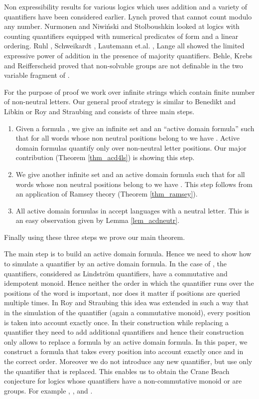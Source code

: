 \documentclass[envcountsame]{llncs}
\begin{document}
Non expressibility results for various logics which uses addition and a variety of quantifiers have been considered earlier. Lynch \cite{lynch82} proved that  cannot count modulo any number. Nurmonen \cite{nur_countQuant} and Niwi\'nski and Stolboushkin \cite{niw_yEq2x} looked at logics with counting quantifiers equipped with numerical predicates of form  and a linear ordering. Ruhl \cite{ruhl_FOUnc}, Schweikardt \cite{schwei_FOUnc},
Lautemann et.al. \cite{lautemann_logcfl}, Lange \cite{lange_majQnt} all showed the limited expressive power of addition in the presence of majority quantifiers. Behle, Krebs and Reifferscheid \cite{behle_regLangMajQnt,behle_nonSolvGrpsNotinMaj} proved that non-solvable groups are not definable in the two variable fragment of . 


For the purpose of proof we work over infinite strings which contain finite number of non-neutral letters. 
Our general proof strategy is similar to Benedikt and Libkin \cite{libkin_relIntrStruc} or Roy and Straubing \cite{roy_defGenFO} and consists of three main steps.
\begin{enumerate}
 \item Given a formula , we give an infinite set  and an ``active domain formula''  such that for all words  whose non neutral positions belong to  we have 
 .
 Active domain formulas quantify only over non-neutral letter positions. Our major contribution (Theorem \ref{thm_acd4ls}) is  showing
 this step.  
 \item We give another infinite set  and an active domain formula  such that for all words  whose non neutral positions belong to  we have 
 .
 This step follows from an application of Ramsey theory (Theorem \ref{thm_ramsey}).
 \item All active domain formulas in  accept languages with a neutral letter. This is an easy observation given by Lemma \ref{lem_acdneutr}.
\end{enumerate}
Finally using these three steps we prove our main theorem.

The main step is to build an active domain formula. Hence we need to show how to simulate a quantifier by an active domain formula.
In the case of , the quantifiers, considered as Lindstr\"om quantifiers, have a commutative and idempotent monoid. Hence
neither the order in which the quantifier runs over the positions of the word is important, nor does it matter if positions are queried
multiple times.
In Roy and Straubing this idea was extended in such a way that in the simulation of the  quantifier (again a commutative monoid),
every position is taken into account exactly once. In their construction while replacing a  quantifier they need to add
additional  quantifiers and hence their construction only allows to replace a  formula by an active domain  formula.
In this paper, we construct a formula that takes every position into account exactly once and in
the correct order. Moreover we do not introduce any new quantifier, but use only the quantifier that is replaced.
This enables us to obtain the Crane Beach conjecture for logics whose quantifiers have a non-commutative monoid or are groups. For
example , , and .
\end{document}
